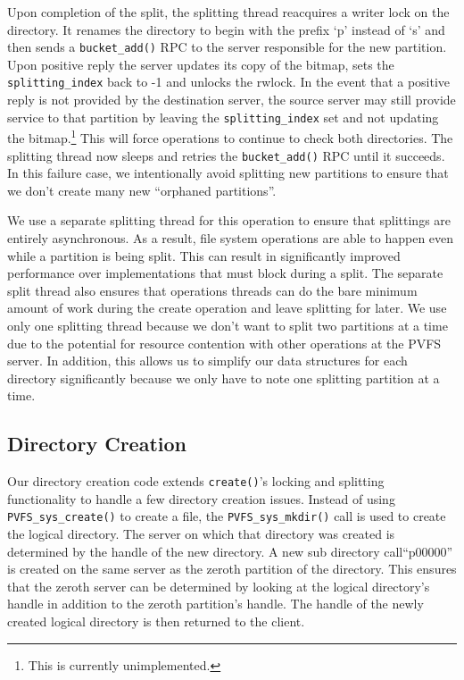 \documentclass[twocolumn,letterpaper]{article}
\newcommand{\code}[1]{\texttt{#1}}
\begin{document}
Upon completion of the split, the splitting thread reacquires a writer lock on
the directory.  It renames the directory to begin with the prefix `p' instead of
`s' and then sends a \code{bucket\_\-add()} RPC to the server responsible for the new
partition.  Upon positive reply the server updates its copy of the bitmap, sets
the \code{splitting\_\-index} back to -1 and unlocks the rwlock.  In the event that
a positive reply is not provided by the destination server, the source server
may still provide service to that partition by leaving the
\code{splitting\_\-index} set and not updating the bitmap.\footnote{This is
currently unimplemented.}  This will force operations to continue to check
both directories.  The splitting thread now sleeps and retries the
\code{bucket\_\-add()} RPC until it succeeds.  In this failure case, we
intentionally avoid splitting new partitions to ensure that we don't create
many new ``orphaned partitions''.

We use a separate splitting thread for this operation to ensure that splittings
are entirely asynchronous.  As a result, file system operations are able to
happen even while a partition is being split.  This can result in significantly
improved performance over implementations that must block during a split.  The
separate split thread also ensures that operations threads can do the bare
minimum amount of work during the create operation and leave splitting for
later.  We use only one splitting thread because we don't want to split two
partitions at a time due to the potential for resource contention with other
operations at the PVFS server.  In addition, this allows us to simplify our data
structures for each directory significantly because we only have to note one
splitting partition at a time.

\subsection{Directory Creation}
Our directory creation code extends \code{create()}'s locking and splitting
functionality to handle a few directory creation issues.  Instead of using
\code{PVFS\_\-sys\_\-create()} to create a file, the \code{PVFS\_\-sys\_\-mkdir()} call is
used to create the logical directory.  The server on which that directory was
created is determined by the handle of the new directory.  A new sub directory
call``p00000'' is created on the same server as the zeroth partition of the
directory.  This ensures that the zeroth server can be determined by looking
at the logical directory's handle in addition to the zeroth partition's handle.
The handle of the newly created logical directory is then returned to the client.
\end{document}
